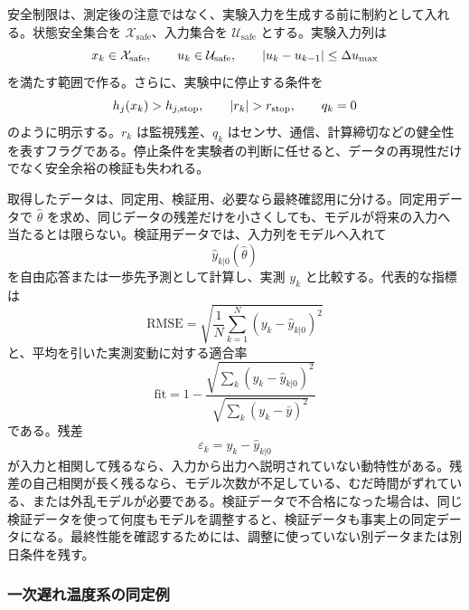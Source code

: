安全制限は、測定後の注意ではなく、実験入力を生成する前に制約として入れる。状態安全集合を $\mathcal{X}_{\mathrm{safe}}$、入力集合を $\mathcal{U}_{\mathrm{safe}}$ とする。実験入力列は
\begin{equation}
  x_k\in\mathcal{X}_{\mathrm{safe}},
  \qquad
  u_k\in\mathcal{U}_{\mathrm{safe}},
  \qquad
  \left|u_k-u_{k-1}\right|\le\Delta u_{\max}
\end{equation}
を満たす範囲で作る。さらに、実験中に停止する条件を
\begin{equation}
  h_j(x_k)>h_{j,\mathrm{stop}},
  \qquad
  \abs{r_k}>r_{\mathrm{stop}},
  \qquad
  q_k=0
\end{equation}
のように明示する。$r_k$ は監視残差、$q_k$ はセンサ、通信、計算締切などの健全性を表すフラグである。停止条件を実験者の判断に任せると、データの再現性だけでなく安全余裕の検証も失われる。

取得したデータは、同定用、検証用、必要なら最終確認用に分ける。同定用データで $\hat{\theta}$ を求め、同じデータの残差だけを小さくしても、モデルが将来の入力へ当たるとは限らない。検証用データでは、入力列をモデルへ入れて
\begin{equation}
  \hat{y}_{k|0}(\hat{\theta})
\end{equation}
を自由応答または一歩先予測として計算し、実測 $y_k$ と比較する。代表的な指標は
\begin{equation}
  \mathrm{RMSE}
  =
  \sqrt{\frac{1}{N}\sum_{k=1}^{N}(y_k-\hat{y}_{k|0})^2}
\end{equation}
と、平均を引いた実測変動に対する適合率
\begin{equation}
  \mathrm{fit}
  =
  1-
  \frac{\sqrt{\sum_k(y_k-\hat{y}_{k|0})^2}}
       {\sqrt{\sum_k(y_k-\bar{y})^2}}
\end{equation}
である。残差
\begin{equation}
  \varepsilon_k=y_k-\hat{y}_{k|0}
\end{equation}
が入力と相関して残るなら、入力から出力へ説明されていない動特性がある。残差の自己相関が長く残るなら、モデル次数が不足している、むだ時間がずれている、または外乱モデルが必要である。検証データで不合格になった場合は、同じ検証データを使って何度もモデルを調整すると、検証データも事実上の同定データになる。最終性能を確認するためには、調整に使っていない別データまたは別日条件を残す。

\subsubsection{一次遅れ温度系の同定例}

